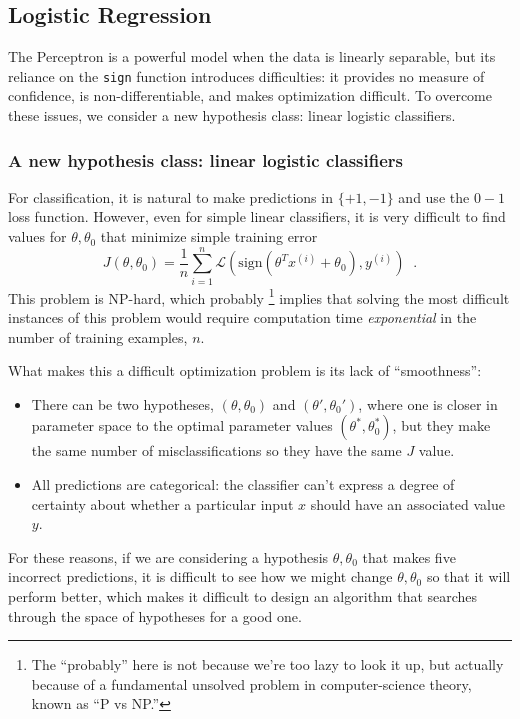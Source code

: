 \documentclass[11pt]{article}
\newcommand{\note}[1]{\todo[color=blue!10,
  linecolor=blue!90,size=\small]{\linespread{0.9}\selectfont{#1}\par}}
\renewcommand{\note}[1]{\footnote{#1}}
\newcommand\ex[2]{#1^{(#2)}}
\begin{document}
\subsection{Logistic Regression}

The Perceptron is a powerful model when the data is linearly separable, but its reliance on the \texttt{sign} function introduces difficulties: it provides no measure of confidence, is non-differentiable, and makes optimization difficult. To overcome these issues, we consider a new hypothesis class: linear logistic classifiers.

\subsubsection*{A new hypothesis class: linear logistic classifiers}

For classification, it is natural to make predictions in $\{+1, -1\}$
and use the $0-1$ loss function.   However, even for simple linear
classifiers, it is very difficult to
find values for $\theta, \theta_0$ that minimize simple training error
\[J(\theta, \theta_0) = \frac{1}{n} \sum_{i=1}^n \mathcal{L}(\text{sign}(\theta^T\ex{x}{i} + \theta_0),
  \ex{y}{i})\;\;.\] This problem is NP-hard, which probably
\note{The ``probably'' here is not because we're too lazy to look it
  up, but actually because of a fundamental unsolved problem in
  computer-science theory, known as ``P vs NP.''}
implies
that solving the most difficult instances of this problem would
require computation time {\em exponential} in the number of training
examples, $n$.

What makes this a difficult optimization problem is its lack of
``smoothness'':
\begin{itemize}
\item There can be two hypotheses, $(\theta, \theta_0)$  and
  $(\theta', \theta_0')$, where
  one is closer in parameter space to the optimal parameter values
  $(\theta^*, \theta_0^*)$, but they make the same number of
  misclassifications so they have the same $J$ value.
\item All predictions are categorical:  the classifier can't express a
  degree of certainty about whether a particular input $x$ should have
  an associated value $y$.
\end{itemize}
For these reasons, if we are considering a hypothesis $\theta,\theta_0$
that makes five incorrect predictions, it is difficult to see how we
might change $\theta,\theta_0$ so that it will perform better, which
makes it difficult to design an algorithm that searches through the
space of hypotheses for a good one.
\end{document}
